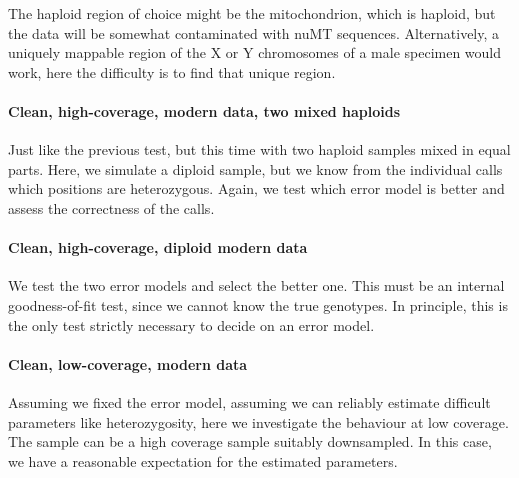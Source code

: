 \documentclass{article}
\begin{document}
The haploid region of choice might be the mitochondrion, which is
haploid, but the data will be somewhat contaminated with nuMT sequences.
Alternatively, a uniquely mappable region of the X or Y chromosomes of a
male specimen would work, here the difficulty is to find that unique
region.


\paragraph{Clean, high-coverage, modern data, two mixed haploids}

Just like the previous test, but this time with two haploid samples
mixed in equal parts.  Here, we simulate a diploid sample, but we know
from the individual calls which positions are heterozygous.  Again, we
test which error model is better and assess the correctness of the
calls.


\paragraph{Clean, high-coverage, diploid modern data}

We test the two error models and select the better one.  This must be an
internal goodness-of-fit test, since we cannot know the true genotypes.
In principle, this is the only test strictly necessary to decide on an
error model.


\paragraph{Clean, low-coverage, modern data}

Assuming we fixed the error model, assuming we can reliably estimate
difficult parameters like heterozygosity, here we investigate the
behaviour at low coverage.  The sample can be a high coverage sample
suitably downsampled.  In this case, we have a reasonable expectation
for the estimated parameters.
\end{document}
